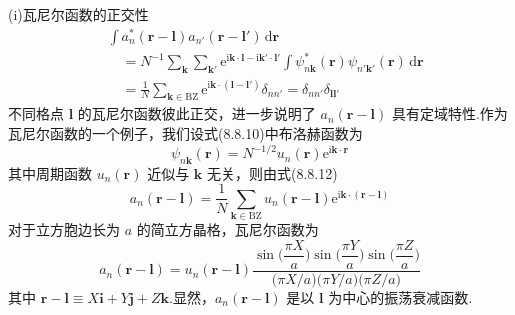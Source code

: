 (i)瓦尼尔函数的正交性
\begin{equation}
\begin{aligned}
  &\int a_{n}^{*}(\boldsymbol{r}-\boldsymbol{l})a_{n'}(\boldsymbol{r}-\boldsymbol{l}')\,\mathrm{d}\boldsymbol{r}\\
  &\quad=N^{-1}\sum_{\boldsymbol{k}}\sum_{\boldsymbol{k}'}
  \mathrm{e}^{\mathrm{i}\boldsymbol{k}\cdot\boldsymbol{l}-\mathrm{i}\boldsymbol{k}'\cdot\boldsymbol{l}'}
  \int\psi_{n\boldsymbol{k}}^{*}(\boldsymbol{r})\psi_{n'\boldsymbol{k}'}(\boldsymbol{r})\,\mathrm{d}\boldsymbol{r}\\
  &\quad=\frac{1}{N}\sum_{\boldsymbol{k}\in\mathrm{BZ}}\mathrm{e}^{\mathrm{i}\boldsymbol{k}\cdot(\boldsymbol{l}-\boldsymbol{l}')}\delta_{nn'}
  =\delta_{nn'}\delta_{\boldsymbol{l}\boldsymbol{l}'}
\end{aligned}
\end{equation}
不同格点 $\boldsymbol{l}$ 的瓦尼尔函数彼此正交，进一步说明了 $a_{n}(\boldsymbol{r}-\boldsymbol{l})$ 具有定域特性.作为瓦尼尔函数的一个例子，我们设式(8.8.10)中布洛赫函数为
\begin{equation}
  \psi_{n\boldsymbol{k}}(\boldsymbol{r})=N^{-1/2}u_{n}(\boldsymbol{r})\mathrm{e}^{\mathrm{i}\boldsymbol{k}\cdot\boldsymbol{r}}
\end{equation}
其中周期函数 $u_{n}(\boldsymbol{r})$ 近似与 $\boldsymbol{k}$ 无关，则由式(8.8.12)
\begin{equation}
  a_{n}(\boldsymbol{r}-\boldsymbol{l})=\frac{1}{N}\sum_{\boldsymbol{k}\in\mathrm{BZ}}u_{n}(\boldsymbol{r}-\boldsymbol{l})\mathrm{e}^{\mathrm{i}\boldsymbol{k}\cdot(\boldsymbol{r}-\boldsymbol{l})}
\end{equation}
对于立方胞边长为 $a$ 的简立方晶格，瓦尼尔函数为
\begin{equation}
  a_{n}(\boldsymbol{r}-\boldsymbol{l})=u_{n}(\boldsymbol{r}-\boldsymbol{l})
  \frac{\sin\bigl(\dfrac{\pi X}{a}\bigr)\sin\bigl(\dfrac{\pi Y}{a}\bigr)\sin\bigl(\dfrac{\pi Z}{a}\bigr)}
  {\bigl(\pi X/a\bigr)\bigl(\pi Y/a\bigr)\bigl(\pi Z/a\bigr)}
\end{equation}
其中 $\boldsymbol{r}-\boldsymbol{l}\equiv X\boldsymbol{i}+Y\boldsymbol{j}+Z\boldsymbol{k}$.显然，$a_{n}(\boldsymbol{r}-\boldsymbol{l})$ 是以 $\boldsymbol{l}$ 为中心的振荡衰减函数.

